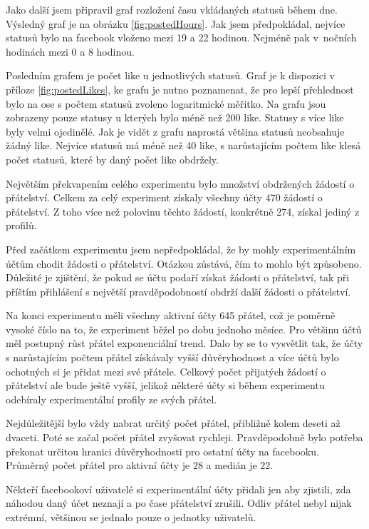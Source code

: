 \documentclass[thesis=M,czech]{FITthesis}[2013/05/10]
\begin{document}
Jako další jsem připravil graf rozložení času vkládaných statusů během dne. Výsledný graf je na obrázku \ref{fig:postedHours}. Jak jsem předpokládal, nejvíce statusů bylo na facebook vloženo mezi 19 a 22 hodinou. Nejméně pak v~nočních hodinách mezi 0 a 8 hodinou.

Posledním grafem je počet like u jednotlivých statusů. Graf je k dispozici v příloze \ref{fig:postedLikes}, ke grafu je nutno poznamenat, že pro lepší přehlednost bylo na ose s počtem statusů zvoleno logaritmické měřítko. Na grafu jsou zobrazeny pouze statusy u kterých bylo méně než 200 like. Statusy s více like byly velmi ojedinělé. Jak je vidět z grafu naprostá většina statusů neobsahuje žádný like. Nejvíce statusů má méně než 40 like, s narůstajícím počtem like klesá počet statusů, které by daný počet like obdržely.



Největším překvapením celého experimentu bylo množství obdržených žádostí o přátelství. Celkem za celý experiment získaly všechny účty 470 žádostí o přátelství. Z toho více než polovinu těchto žádostí, konkrétně 274, získal jediný z profilů. 

Před začátkem experimentu jsem nepředpokládal, že by mohly experimentálním účtům chodit žádosti o přátelství. Otázkou zůstává, čím to mohlo být způsobeno. Důležité je zjištění, že pokud se účtu podaří získat žádosti o přátelství, tak při příštím přihlášení s největší pravděpodobností obdrží další žádosti o přátelství.

Na konci experimentu měli všechny aktivní účty 645 přátel, což je poměrně vysoké číslo na to, že experiment běžel po dobu jednoho měsíce. Pro většinu účtů měl postupný růst přátel exponenciální trend. Dalo by se to vysvětlit tak, že účty s narůstajícím počtem přátel získávaly vyšší důvěryhodnost a více účtů bylo ochotných si je přidat mezi své přátele. Celkový počet přijatých žádostí o přátelství ale bude ještě vyšší, jelikož některé účty si během experimentu odebíraly experimentální profily ze svých přátel. 

Nejdůležitější bylo vždy nabrat určitý počet přátel, přibližně kolem deseti až dvaceti. Poté se začal počet přátel zvyšovat rychleji. Pravděpodobně bylo potřeba překonat určitou hranici důvěryhodnosti pro ostatní účty na facebooku. Průměrný počet přátel pro aktivní účty je 28 a medián je 22. 

Někteří facebookoví uživatelé si experimentální účty přidali jen aby zjistili, zda náhodou daný účet neznají a po čase přátelství zrušili. Odliv přátel nebyl nijak extrémní, většinou se jednalo pouze o jednotky uživatelů. 
\end{document}
